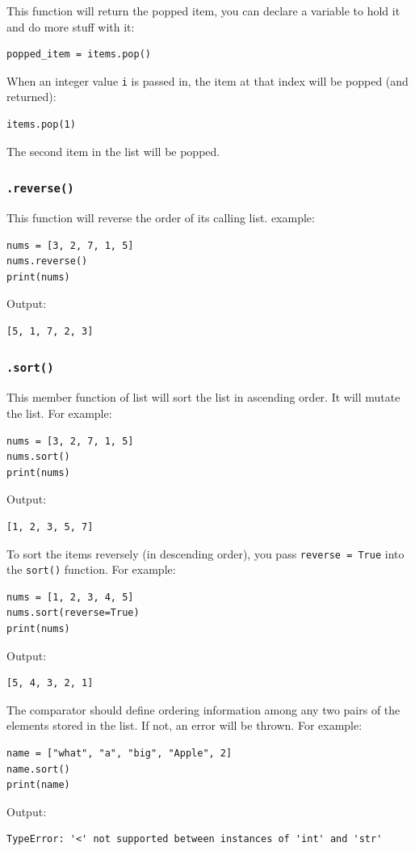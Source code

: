 \documentclass[12pt]{book}
\begin{document}
This function will return the popped item, you can declare a variable to hold it and do more stuff with it:
\begin{verbatim}
popped_item = items.pop()
\end{verbatim}

When an integer value \texttt{i} is passed in, the item at that index will be popped (and returned):
\begin{verbatim}
items.pop(1)
\end{verbatim}
The second item in the list will be popped.
\subsubsection{\texttt{.reverse()}}
\label{sec:orgc12c84d}
This function will reverse the order of its calling list. example:
\begin{verbatim}
nums = [3, 2, 7, 1, 5]
nums.reverse()
print(nums)
\end{verbatim}
Output:
\begin{verbatim}
[5, 1, 7, 2, 3]
\end{verbatim}
\subsubsection{\texttt{.sort()}}
\label{sec:orgd6f1cf2}
This member function of list will sort the list in ascending order. It will mutate the list. For example:
\begin{verbatim}
nums = [3, 2, 7, 1, 5]
nums.sort()
print(nums)
\end{verbatim}
Output:
\begin{verbatim}
[1, 2, 3, 5, 7]
\end{verbatim}

To sort the items reversely (in descending order), you pass \texttt{reverse = True} into the \texttt{sort()} function. For example:
\begin{verbatim}
nums = [1, 2, 3, 4, 5]
nums.sort(reverse=True)
print(nums)
\end{verbatim}
Output:
\begin{verbatim}
[5, 4, 3, 2, 1]
\end{verbatim}

The comparator should define ordering information among any two pairs of the elements stored in the list. If not, an error will be thrown. For example:
\begin{verbatim}
name = ["what", "a", "big", "Apple", 2]
name.sort()
print(name)
\end{verbatim}
Output:
\begin{verbatim}
TypeError: '<' not supported between instances of 'int' and 'str'
\end{verbatim}
\end{document}
